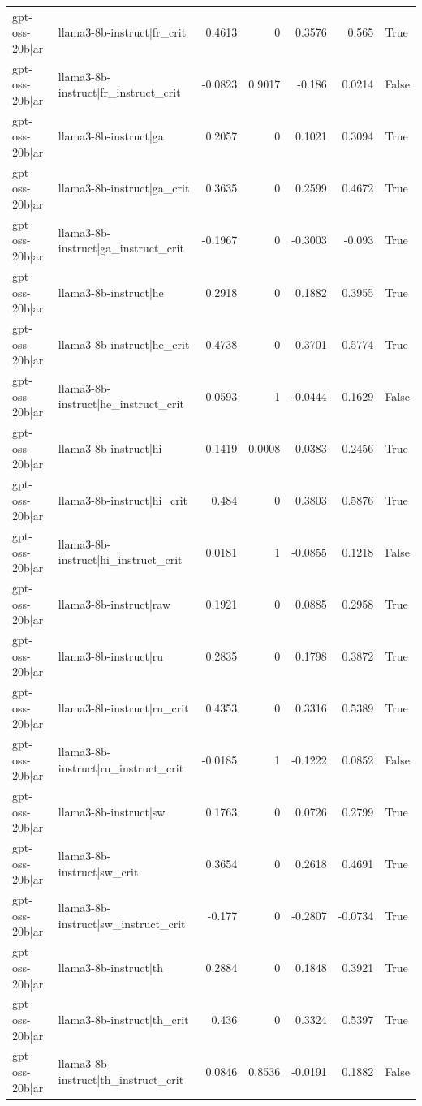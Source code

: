 \begin{table}
\begin{tabular}{l l r r r r l}
gpt-oss-20b|ar & llama3-8b-instruct|fr_crit & 0.4613 & 0 & 0.3576 & 0.565 & True \\
gpt-oss-20b|ar & llama3-8b-instruct|fr_instruct_crit & -0.0823 & 0.9017 & -0.186 & 0.0214 & False \\
gpt-oss-20b|ar & llama3-8b-instruct|ga & 0.2057 & 0 & 0.1021 & 0.3094 & True \\
gpt-oss-20b|ar & llama3-8b-instruct|ga_crit & 0.3635 & 0 & 0.2599 & 0.4672 & True \\
gpt-oss-20b|ar & llama3-8b-instruct|ga_instruct_crit & -0.1967 & 0 & -0.3003 & -0.093 & True \\
gpt-oss-20b|ar & llama3-8b-instruct|he & 0.2918 & 0 & 0.1882 & 0.3955 & True \\
gpt-oss-20b|ar & llama3-8b-instruct|he_crit & 0.4738 & 0 & 0.3701 & 0.5774 & True \\
gpt-oss-20b|ar & llama3-8b-instruct|he_instruct_crit & 0.0593 & 1 & -0.0444 & 0.1629 & False \\
gpt-oss-20b|ar & llama3-8b-instruct|hi & 0.1419 & 0.0008 & 0.0383 & 0.2456 & True \\
gpt-oss-20b|ar & llama3-8b-instruct|hi_crit & 0.484 & 0 & 0.3803 & 0.5876 & True \\
gpt-oss-20b|ar & llama3-8b-instruct|hi_instruct_crit & 0.0181 & 1 & -0.0855 & 0.1218 & False \\
gpt-oss-20b|ar & llama3-8b-instruct|raw & 0.1921 & 0 & 0.0885 & 0.2958 & True \\
gpt-oss-20b|ar & llama3-8b-instruct|ru & 0.2835 & 0 & 0.1798 & 0.3872 & True \\
gpt-oss-20b|ar & llama3-8b-instruct|ru_crit & 0.4353 & 0 & 0.3316 & 0.5389 & True \\
gpt-oss-20b|ar & llama3-8b-instruct|ru_instruct_crit & -0.0185 & 1 & -0.1222 & 0.0852 & False \\
gpt-oss-20b|ar & llama3-8b-instruct|sw & 0.1763 & 0 & 0.0726 & 0.2799 & True \\
gpt-oss-20b|ar & llama3-8b-instruct|sw_crit & 0.3654 & 0 & 0.2618 & 0.4691 & True \\
gpt-oss-20b|ar & llama3-8b-instruct|sw_instruct_crit & -0.177 & 0 & -0.2807 & -0.0734 & True \\
gpt-oss-20b|ar & llama3-8b-instruct|th & 0.2884 & 0 & 0.1848 & 0.3921 & True \\
gpt-oss-20b|ar & llama3-8b-instruct|th_crit & 0.436 & 0 & 0.3324 & 0.5397 & True \\
gpt-oss-20b|ar & llama3-8b-instruct|th_instruct_crit & 0.0846 & 0.8536 & -0.0191 & 0.1882 & False \\

\end{tabular}
\end{table}
